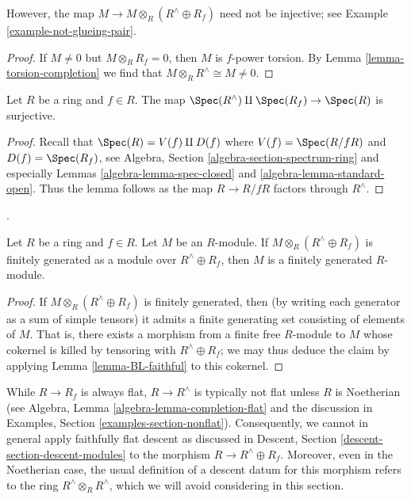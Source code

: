 \noindent
However, the map $M \to M \otimes_R (R^\wedge \oplus R_f)$ need not be 
injective; see Example \ref{example-not-glueing-pair}.

\begin{proof}
If $M \neq 0$ but $M \otimes_R R_f = 0$, then $M$ is $f$-power torsion.
By Lemma \ref{lemma-torsion-completion} we find that
$M \otimes_R R^\wedge \cong M \neq 0$.
\end{proof}

\begin{lemma}
\label{lemma-cover-spec}
Let $R$ be a ring and $f \in R$.
The map $\Spec(R^\wedge) \amalg \Spec(R_f) \to \Spec(R)$ is surjective.
\end{lemma}

\begin{proof}
Recall that $\Spec(R) = V(f) \amalg D(f)$ where $V(f) = \Spec(R/fR)$
and $D(f) = \Spec(R_f)$, see
Algebra, Section \ref{algebra-section-spectrum-ring}
and especially Lemmas \ref{algebra-lemma-spec-closed} and
\ref{algebra-lemma-standard-open}.
Thus the lemma follows as the map $R \to R/fR$ factors through $R^\wedge$.
\end{proof}

\begin{lemma}
\label{lemma-faithful-descent}
\begin{reference}
\cite[Lemme~2(a)]{Beauville-Laszlo}.
\end{reference}
Let $R$ be a ring and $f \in R$.
Let $M$ be an $R$-module. If $M \otimes_R (R^\wedge \oplus R_f)$
is finitely generated as a module over $R^\wedge \oplus R_f$, then
$M$ is a finitely generated $R$-module.
\end{lemma}

\begin{proof}
If $M \otimes_R (R^\wedge \oplus R_f)$ is finitely generated, then (by 
writing each generator as a sum of simple tensors) it admits a finite 
generating set consisting of elements of $M$.
That is, there exists a morphism from a finite free $R$-module to $M$ whose 
cokernel is killed by tensoring with $R^\wedge \oplus R_f$; 
we may thus deduce the claim by applying
Lemma \ref{lemma-BL-faithful} to this cokernel.
\end{proof}

\begin{remark}
\label{remark-not-descent}
While $R \to R_f$ is always flat, $R \to R^\wedge$ is typically not flat 
unless $R$ is Noetherian (see
Algebra, Lemma \ref{algebra-lemma-completion-flat}
and the discussion in
Examples, Section \ref{examples-section-nonflat}).
Consequently, we cannot in general apply faithfully flat descent
as discussed in Descent, Section
\ref{descent-section-descent-modules}
to the morphism $R \to R^\wedge \oplus R_f$.
Moreover, even in the Noetherian case, the usual 
definition of a descent datum for this morphism
refers to the ring $R^\wedge \otimes_R R^\wedge$, which we will
avoid considering in this section.
\end{remark}

